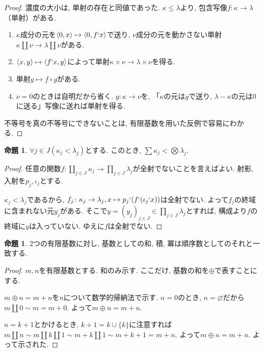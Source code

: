 \documentclass[a4paper, twoside]{bxjsarticle}
\theoremstyle{definition}
\newtheorem{prop}[thm]{命題}
\begin{document}
        \begin{proof}
            濃度の大小は, 単射の存在と同値であった. $\kappa\leq\lambda$より, 包含写像$f\colon \kappa\to\lambda$（単射）がある.
            \begin{enumerate}
                \item $\kappa$成分の元を$\langle 0, x\rangle \mapsto \langle 0, f`x\rangle$で送り, $\nu$成分の元を動かさない単射$\kappa\coprod\nu\to\lambda\coprod\nu$がある.
                \item $\langle x, y\rangle \mapsto \langle f`x, y\rangle$によって単射$\kappa\times\nu\to\lambda\times\nu$を得る.
                \item 単射$g\mapsto f\circ g$がある.
                \item $\nu=0$のときは自明だから省く. $g\colon \kappa\to\nu$を, 「$\kappa$の元は$g$で送り, $\lambda-\kappa$の元は0に送る」写像に送れば単射を得る.
            \end{enumerate}
            不等号を真の不等号にできないことは, 有限基数を用いた反例で容易にわかる.
        \end{proof}
        \begin{prop}
            $\forall j\in J(\kappa_j<\lambda_j)$とする. このとき, $\sum\kappa_j<\bigotimes\lambda_j$.
        \end{prop}
        \begin{proof}
            任意の関数$f\colon \coprod_{j\in J}\kappa_j\to\prod_{j\in J}\lambda_j$が全射でないことを言えばよい. 射影, 入射を$p_j, \iota_j$とする.
            
            $\kappa_j<\lambda_j$であるから, $f_j\colon \kappa_j\to\lambda_j, x\mapsto p_j`(f`(\iota_j`x))$は全射でない. よって$f_j$の終域に含まれない元$y_j$がある. そこで$y=(y_j)_{j\in J}\in \prod_{j\in J}\lambda_j$とすれば, 構成より$f$の終域に$y$は入っていない. ゆえに$f$は全射でない.
        \end{proof}
        \begin{prop}
            2つの有限基数に対し, 基数としての和, 積, 冪は順序数としてのそれと一致する.
        \end{prop}
        \begin{proof}
            $m, n$を有限基数とする. 和のみ示す. ここだけ, 基数の和を$\oplus$で表すことにする.
            
            $m\oplus n=m+n$を$n$について数学的帰納法で示す. $n=0$のとき, $n=\varnothing$だから$m\coprod 0\sim m=m+0$. よって$m\oplus n=m+n$.
            
            $n=k+1$とかけるとき, $k+1=k\cup\{k\}$に注意すれば$m\coprod n\sim m\coprod k\coprod 1\sim m+k\coprod1\sim m+k+1=m+n$. よって$m\oplus n=m+n$. よって示された.
        \end{proof}
\end{document}
